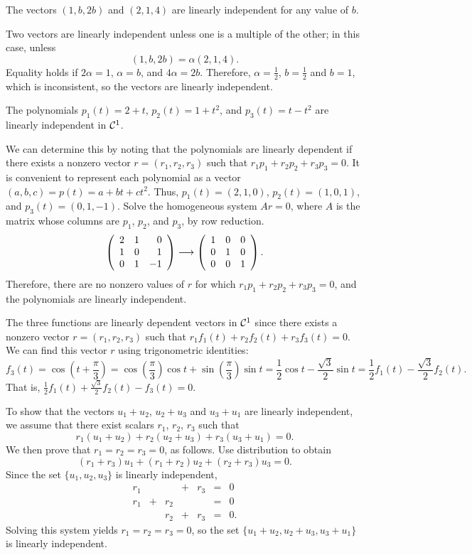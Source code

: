 \ans The vectors $(1,b,2b)$ and $(2,1,4)$ are linearly independent
for any value of $b$.

\soln Two vectors are linearly independent unless one is a multiple
of the other; in this case, unless
\[
(1,b,2b) = \alpha(2,1,4).
\]
Equality holds if $2\alpha = 1$, $\alpha = b$, and $4\alpha = 2b$.
Therefore, $\alpha = \frac{1}{2}$, $b = \frac{1}{2}$ and $b = 1$,
which is inconsistent, so the vectors are linearly independent.

\ans The polynomials $p_1(t) = 2 + t$, $p_2(t) = 1 + t^2$, and $p_3(t) =
t - t^2$ are linearly independent in ${\cal C}^1$.  

\soln We can determine this
by noting that the polynomials are linearly dependent if there exists
a nonzero vector $r = (r_1,r_2,r_3)$ such that $r_1p_1 + r_2p_2 +
r_3p_3 = 0$.  It is convenient to represent each polynomial as a
vector $(a,b,c) = p(t) = a + bt + ct^2$.  Thus, $p_1(t) = (2,1,0)$, 
$p_2(t) = (1,0,1)$, and $p_3(t) = (0,1,-1)$.  Solve the homogeneous
system $Ar = 0$, where $A$ is the matrix whose columns are $p_1$,
$p_2$, and $p_3$, by row reduction.
\[ \left(\begin{array}{rrr} 2 & 1 & 0 \\ 1 & 0 & 1 \\ 0 & 1 & -1\end{array}\right) \longrightarrow
\left(\begin{array}{rrr} 1 & 0 & 0 \\ 0 & 1 & 0 \\ 0 & 0 & 1\end{array}\right). \]
Therefore, there are no nonzero values of $r$ for which $r_1p_1 + 
r_2p_2 + r_3p_3 = 0$, and the polynomials are linearly independent.

\newpage
{}
The three functions are linearly dependent vectors in ${\cal C}^1$ since
there exists a nonzero vector $r = (r_1,r_2,r_3)$ such that
$r_1f_1(t) + r_2f_2(t) + r_3f_3(t) = 0$.  We can find this vector $r$
using trigonometric identities:
\[ f_3(t) = \cos\left(t + \frac{\pi}{3}\right) =
\cos\left(\frac{\pi}{3}\right)\cos t + \sin\left(\frac{\pi}{3}\right)\sin t
= \frac{1}{2}\cos t - \frac{\sqrt{3}}{2}\sin t =
\frac{1}{2}f_1(t) - \frac{\sqrt{3}}{2}f_2(t). \]
That is, $\frac{1}{2}f_1(t) + \frac{\sqrt{3}}{2}f_2(t) - f_3(t) = 0$.

To show that the vectors $u_1 + u_2$, $u_2 + u_3$ and $u_3 + u_1$
are linearly independent, we assume that there exist scalars $r_1$,
$r_2$, $r_3$ such that
\[ r_1(u_1 + u_2) + r_2(u_2 + u_3) + r_3(u_3 + u_1) = 0. \]
We then prove that $r_1 = r_2 = r_3 = 0$, as follows.
Use distribution to obtain
\[ (r_1 + r_3)u_1 + (r_1 + r_2)u_2 + (r_2 + r_3)u_3 = 0. \]
Since the set $\{u_1,u_2,u_3\}$ is linearly independent,
\[ \begin{array}{rrrrrcl}
r_1 & & & + & r_3 & = & 0 \\
r_1 & + & r_2 & & & = & 0 \\
& & r_2 & + & r_3 & = & 0. \end{array} \]
Solving this system yields $r_1 = r_2 = r_3 = 0$,
so the set $\{u_1 + u_2,u_2 + u_3,u_3 + u_1\}$ is linearly
independent.

